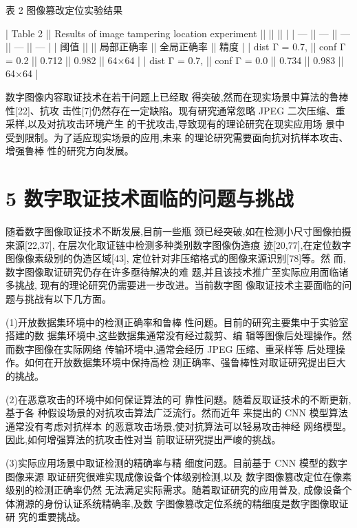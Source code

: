 \documentclass{article}
\begin{document}
表 2 图像篡改定位实验结果

| Table 2       || Results of image tampering location experiment ||       ||       ||       |
| ---           || ---                                            || ---   || ---   || ---   |
| 阈值            ||                                                || 局部正确率 || 全局正确率 || 精度    |
| dist Γ = 0.7, || conf Γ = 0.2                                   || 0.712 || 0.982 || 64×64 |
| dist Γ = 0.7, || conf Γ = 0.0                                   || 0.734 || 0.983 || 64×64 |

数字图像内容取证技术在若干问题上已经取 得突破,然而在现实场景中算法的鲁棒性[22]、抗攻 击性[7]仍然存在一定缺陷。现有研究通常忽略 JPEG 二次压缩、重采样,以及对抗攻击环境产生 的干扰攻击,导致现有的理论研究在现实应用场 景中受到限制。为了适应现实场景的应用,未来 的理论研究需要面向抗对抗样本攻击、增强鲁棒 性的研究方向发展。

\section{5 数字取证技术面临的问题与挑战}

随着数字图像取证技术不断发展,目前一些瓶 颈已经突破,如在检测小尺寸图像拍摄来源[22,37], 在层次化取证链中检测多种类别数字图像伪造痕 迹[20,77],在定位数字图像像素级别的伪造区域[43], 定位针对非压缩格式的图像来源识别[78]等。然 而,数字图像取证研究仍存在许多亟待解决的难 题,并且该技术推广至实际应用面临诸多挑战, 现有的理论研究仍需要进一步改进。当前数字图 像取证技术主要面临的问题与挑战有以下几方面。

(1)开放数据集环境中的检测正确率和鲁棒 性问题。目前的研究主要集中于实验室搭建的数 据集环境中,这些数据集通常没有经过裁剪、编 辑等图像后处理操作。然而数字图像在实际网络 传输环境中,通常会经历 JPEG 压缩、重采样等 后处理操作。如何在开放数据集环境中保持高检 测正确率、强鲁棒性对取证研究提出巨大的挑战。

(2)在恶意攻击的环境中如何保证算法的可 靠性问题。随着反取证技术的不断更新,基于各 种假设场景的对抗攻击算法广泛流行。然而近年 来提出的 CNN 模型算法通常没有考虑对抗样本 的恶意攻击场景,使对抗算法可以轻易攻击神经 网络模型。因此,如何增强算法的抗攻击性对当 前取证研究提出严峻的挑战。

(3)实际应用场景中取证检测的精确率与精 细度问题。目前基于 CNN 模型的数字图像来源 取证研究很难实现成像设备个体级别检测,以及 数字图像篡改定位在像素级别的检测正确率仍然 无法满足实际需求。随着取证研究的应用普及, 成像设备个体溯源的身份认证系统精确率,及数 字图像篡改定位系统的精细度是数字图像取证研 究的重要挑战。
\end{document}
